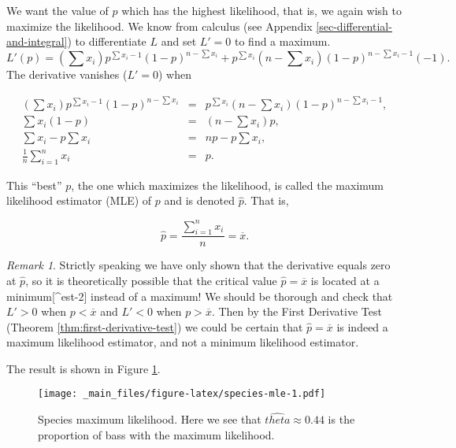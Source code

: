 \documentclass[]{book}
\numberwithin{equation}{chapter}
\numberwithin{figure}{chapter}
\theoremstyle{plain}
\theoremstyle{definition}
\theoremstyle{remark}
\theoremstyle{definition}
\theoremstyle{definition}
\theoremstyle{remark}
\newtheorem*{remark}{Remark}
\begin{document}
We want the value of \(p\) which has the highest likelihood, that is, we
again wish to maximize the likelihood. We know from calculus (see
Appendix \ref{sec-differential-and-integral}) to differentiate \(L\) and
set \(L'=0\) to find a maximum. \[ L'(p)=\left(\sum
x_{i}\right)p^{\sum x_{i}-1}(1-p)^{n-\sum x_{i}}+p^{\sum
x_{i}}\left(n-\sum x_{i}\right)(1-p)^{n-\sum x_{i}-1}(-1).  \] The
derivative vanishes (\(L'=0\)) when

\begin{eqnarray*}
\left(\sum x_{i}\right)p^{\sum x_{i}-1}(1-p)^{n-\sum x_{i}} & = & p^{\sum x_{i}}\left(n-\sum x_{i}\right)(1-p)^{n-\sum x_{i}-1},\\
\sum x_{i}(1-p) & = & \left(n-\sum x_{i}\right)p,\\
\sum x_{i}-p\sum x_{i} & = & np-p\sum x_{i},\\
\frac{1}{n}\sum_{i=1}^{n}x_{i} & = & p.
\end{eqnarray*}

This ``best'' \(p\), the one which maximizes the likelihood, is called
the maximum likelihood estimator (MLE) of \(p\) and is denoted
\(\hat{p}\). That is,

\begin{equation} 
\hat{p}=\frac{\sum_{i=1}^{n}x_{i}}{n}=\overline{x}.
\end{equation}

\bigskip

\begin{remark}
Strictly speaking we have only shown that the derivative equals zero at
\(\hat{p}\), so it is theoretically possible that the critical value
\(\hat{p}=\overline{x}\) is located at a minimum{[}\^{}est-2{]} instead
of a maximum! We should be thorough and check that \(L'>0\) when
\(p<\overline{x}\) and \(L'<0\) when \(p>\overline{x}\). Then by the
First Derivative Test (Theorem \ref{thm:first-derivative-test}) we could
be certain that \(\hat{p}=\overline{x}\) is indeed a maximum likelihood
estimator, and not a minimum likelihood estimator.
\end{remark}

The result is shown in Figure \ref{fig:species-mle}.

\begin{figure}[htbp]
\centering
\texttt{[image: \_main\_files/figure-latex/species-mle-1.pdf]}
\caption{\label{fig:species-mle}\small Species maximum likelihood. Here we see
that \(\hat{theta} \approx 0.44\) is the proportion of bass with the
maximum likelihood.}
\end{figure}
\end{document}
